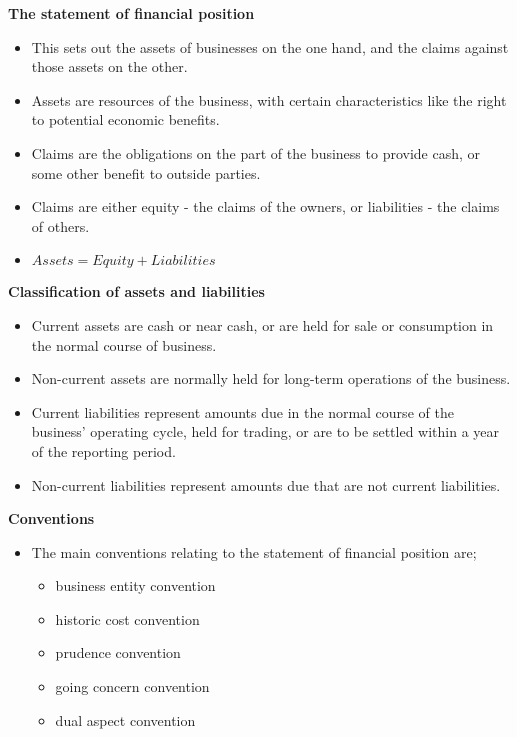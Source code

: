 \documentclass{report}
\begin{document}
\textbf{The statement of financial position}
\begin{itemize}
    \item This sets out the assets of businesses on the one hand, and the claims against those assets on the other.
    \item Assets are resources of the business, with certain characteristics like the right to potential economic benefits.
    \item Claims are the obligations on the part of the business to provide cash, or some other benefit to outside parties.
    \item Claims are either equity - the claims of the owners, or liabilities - the claims of others.
    \item $Assets = Equity + Liabilities$\\
\end{itemize}

\textbf{Classification of assets and liabilities}
\begin{itemize}
    \item Current assets are cash or near cash, or are held for sale or consumption in the normal course of business.
    \item Non-current assets are normally held for long-term operations of the business.
    \item Current liabilities represent amounts due in the normal course of the business' operating cycle, held for trading, or are to be settled within a year of the reporting period.
    \item Non-current liabilities represent amounts due that are not current liabilities.\\
\end{itemize}

\textbf{Conventions}
\begin{itemize}
    \item The main conventions relating to the statement of financial position are;
    \begin{itemize}
        \item business entity convention
        \item historic cost convention
        \item prudence convention
        \item going concern convention
        \item dual aspect convention\\
    \end{itemize}
\end{itemize}
\end{document}
